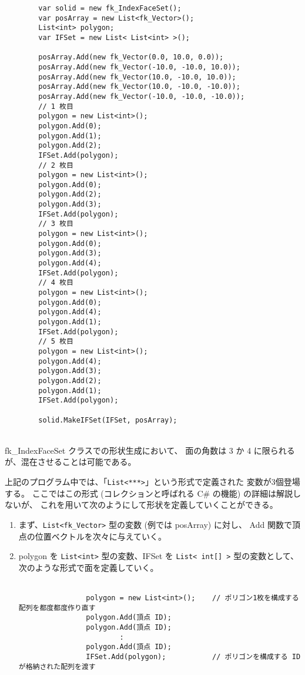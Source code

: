 \begin{breakbox}
\begin{verbatim}
        var solid = new fk_IndexFaceSet();
        var posArray = new List<fk_Vector>();
        List<int> polygon;
        var IFSet = new List< List<int> >();

        posArray.Add(new fk_Vector(0.0, 10.0, 0.0));
        posArray.Add(new fk_Vector(-10.0, -10.0, 10.0));
        posArray.Add(new fk_Vector(10.0, -10.0, 10.0));
        posArray.Add(new fk_Vector(10.0, -10.0, -10.0));
        posArray.Add(new fk_Vector(-10.0, -10.0, -10.0));
        // 1 枚目
        polygon = new List<int>();
        polygon.Add(0);
        polygon.Add(1);
        polygon.Add(2);
        IFSet.Add(polygon);
        // 2 枚目
        polygon = new List<int>();
        polygon.Add(0);
        polygon.Add(2);
        polygon.Add(3);
        IFSet.Add(polygon);
        // 3 枚目
        polygon = new List<int>();
        polygon.Add(0);
        polygon.Add(3);
        polygon.Add(4);
        IFSet.Add(polygon);
        // 4 枚目
        polygon = new List<int>();
        polygon.Add(0);
        polygon.Add(4);
        polygon.Add(1);
        IFSet.Add(polygon);
        // 5 枚目
        polygon = new List<int>();
        polygon.Add(4);
        polygon.Add(3);
        polygon.Add(2);
        polygon.Add(1);
        IFSet.Add(polygon);

        solid.MakeIFSet(IFSet, posArray);
\end{verbatim}
\end{breakbox}
~ \\
fk\_IndexFaceSet クラスでの形状生成において、
面の角数は 3 か 4 に限られるが、混在させることは可能である。

上記のプログラム中では、「\verb+List<***>+」という形式で定義された
変数が3個登場する。
ここではこの形式 (コレクションと呼ばれる C\# の機能) の詳細は解説しないが、
これを用いて次のようにして形状を定義していくことができる。
\begin{enumerate}
 \item まず、\verb+List<fk_Vector>+ 型の変数 (例では posArray) に対し、
	Add 関数で頂点の位置ベクトルを次々に与えていく。

 \item polygon を \verb+List<int>+ 型の変数、IFSet を
	\verb+List< int[] >+ 型の変数として、
	次のような形式で面を定義していく。\\ ~ \\
	\begin{screen}
	\begin{verbatim}
                polygon = new List<int>();    // ポリゴン1枚を構成する配列を都度都度作り直す
                polygon.Add(頂点 ID);
                polygon.Add(頂点 ID);
                        :
                polygon.Add(頂点 ID);
                IFSet.Add(polygon);           // ポリゴンを構成する ID が格納された配列を渡す
	\end{verbatim}
	\end{screen}
\end{enumerate}

